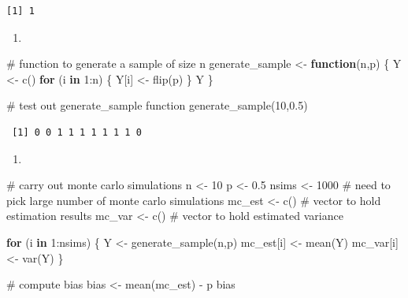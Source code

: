 \documentclass[
  letterpaper,
  DIV=11,
  numbers=noendperiod]{scrreprt}
\newenvironment{Shaded}{\begin{snugshade}}{\end{snugshade}}
\newcommand{\CommentTok}[1]{\textcolor[rgb]{0.37,0.37,0.37}{#1}}
\newcommand{\ControlFlowTok}[1]{\textcolor[rgb]{0.00,0.23,0.31}{\textbf{#1}}}
\newcommand{\DecValTok}[1]{\textcolor[rgb]{0.68,0.00,0.00}{#1}}
\newcommand{\FloatTok}[1]{\textcolor[rgb]{0.68,0.00,0.00}{#1}}
\newcommand{\FunctionTok}[1]{\textcolor[rgb]{0.28,0.35,0.67}{#1}}
\newcommand{\NormalTok}[1]{\textcolor[rgb]{0.00,0.23,0.31}{#1}}
\newcommand{\OtherTok}[1]{\textcolor[rgb]{0.00,0.23,0.31}{#1}}
\newcommand{\SpecialCharTok}[1]{\textcolor[rgb]{0.37,0.37,0.37}{#1}}
\providecommand{\tightlist}{%
  \setlength{\itemsep}{0pt}\setlength{\parskip}{0pt}}\usepackage{longtable,booktabs,array}
\begin{document}
\begin{verbatim}
[1] 1
\end{verbatim}

\begin{enumerate}
\def\labelenumi{\arabic{enumi}.}
\setcounter{enumi}{1}
\tightlist
\item
\end{enumerate}

\begin{Shaded}
\begin{Highlighting}[]
\CommentTok{\# function to generate a sample of size n}
\NormalTok{generate\_sample }\OtherTok{\textless{}{-}} \ControlFlowTok{function}\NormalTok{(n,p) \{}
\NormalTok{  Y }\OtherTok{\textless{}{-}} \FunctionTok{c}\NormalTok{()}
  \ControlFlowTok{for}\NormalTok{ (i }\ControlFlowTok{in} \DecValTok{1}\SpecialCharTok{:}\NormalTok{n) \{}
\NormalTok{    Y[i] }\OtherTok{\textless{}{-}} \FunctionTok{flip}\NormalTok{(p)}
\NormalTok{  \}}
\NormalTok{  Y}
\NormalTok{\}}

\CommentTok{\# test out generate\_sample function}
\FunctionTok{generate\_sample}\NormalTok{(}\DecValTok{10}\NormalTok{,}\FloatTok{0.5}\NormalTok{)}
\end{Highlighting}
\end{Shaded}

\begin{verbatim}
 [1] 0 0 1 1 1 1 1 1 1 0
\end{verbatim}

\begin{enumerate}
\def\labelenumi{\arabic{enumi}.}
\setcounter{enumi}{2}
\tightlist
\item
\end{enumerate}

\begin{Shaded}
\begin{Highlighting}[]
\CommentTok{\# carry out monte carlo simulations}
\NormalTok{n }\OtherTok{\textless{}{-}} \DecValTok{10}
\NormalTok{p }\OtherTok{\textless{}{-}} \FloatTok{0.5}
\NormalTok{nsims }\OtherTok{\textless{}{-}} \DecValTok{1000}  \CommentTok{\# need to pick large number of monte carlo simulations}
\NormalTok{mc\_est }\OtherTok{\textless{}{-}} \FunctionTok{c}\NormalTok{()  }\CommentTok{\# vector to hold estimation results}
\NormalTok{mc\_var }\OtherTok{\textless{}{-}} \FunctionTok{c}\NormalTok{()  }\CommentTok{\# vector to hold estimated variance}

\ControlFlowTok{for}\NormalTok{ (i }\ControlFlowTok{in} \DecValTok{1}\SpecialCharTok{:}\NormalTok{nsims) \{}
\NormalTok{  Y }\OtherTok{\textless{}{-}} \FunctionTok{generate\_sample}\NormalTok{(n,p)}
\NormalTok{  mc\_est[i] }\OtherTok{\textless{}{-}} \FunctionTok{mean}\NormalTok{(Y)}
\NormalTok{  mc\_var[i] }\OtherTok{\textless{}{-}} \FunctionTok{var}\NormalTok{(Y)}
\NormalTok{\}}

\CommentTok{\# compute bias}
\NormalTok{bias }\OtherTok{\textless{}{-}} \FunctionTok{mean}\NormalTok{(mc\_est) }\SpecialCharTok{{-}}\NormalTok{ p}
\NormalTok{bias}
\end{Highlighting}
\end{Shaded}
\end{document}
